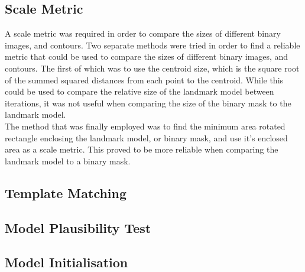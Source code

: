 \documentclass[a4paper, 12pt]{article}
\begin{document}
	\subsection{Scale Metric}
	A scale metric was required in order to compare the sizes of different binary images, and contours.
	Two separate methods were tried in order to find a reliable metric that could be used to compare the sizes of different binary images, and contours.
	The first of which was to use the centroid size, which is the square root of the summed squared distances from each point to the centroid.
	While this could be used to compare the relative size of the landmark model between iterations, it was not useful when comparing the size of the binary
	mask to the landmark model.\\
	The method that was finally employed was to find the minimum area rotated rectangle enclosing the landmark model, or binary mask, and use it's enclosed 	area as a scale metric. This proved to be more reliable when comparing the landmark model to a binary mask.
	\subsection{Template Matching}
	\subsection{Model Plausibility Test}
	\subsection{Model Initialisation}
\end{document}
